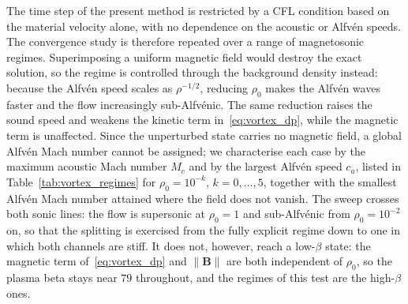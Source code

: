 \documentclass[a4paper,fleqn]{cas-sc}
\theoremstyle{remark}
\newcommand{\Bb}{\mathbf{B}}
\begin{document}
The time step of the present method is restricted by a CFL condition based on
the material velocity alone, with no dependence on the acoustic or Alfv\'en
speeds. The convergence study is therefore repeated over a range of
magnetosonic regimes. Superimposing a uniform magnetic field would destroy the
exact solution, so the regime is controlled through the background density
instead: because the Alfv\'en speed scales as $\rho^{-1/2}$, reducing $\rho_0$
makes the Alfv\'en waves faster and the flow increasingly sub-Alfv\'enic. The
same reduction raises the sound speed and weakens the kinetic term
in~\eqref{eq:vortex_dp}, while the magnetic term is unaffected. Since the
unperturbed state carries no magnetic field, a global Alfv\'en Mach number
cannot be assigned; we characterise each case by the maximum acoustic Mach
number $M_c$ and by the largest Alfv\'en speed $c_a$, listed in
Table~\ref{tab:vortex_regimes} for $\rho_0=10^{-k}$, $k=0,\dots,5$, together
with the smallest Alfv\'en Mach number attained where the field does not
vanish. The sweep crosses both sonic lines: the flow is supersonic at
$\rho_0=1$ and sub-Alfv\'enic from $\rho_0=10^{-2}$ on, so that the splitting
is exercised from the fully explicit regime down to one in which both channels
are stiff. It does not, however, reach a low-$\beta$ state: the magnetic term
of~\eqref{eq:vortex_dp} and $\|\Bb\|$ are both independent of $\rho_0$, so
the plasma beta stays near $79$ throughout, and the regimes of this test are
the high-$\beta$ ones.
\end{document}
